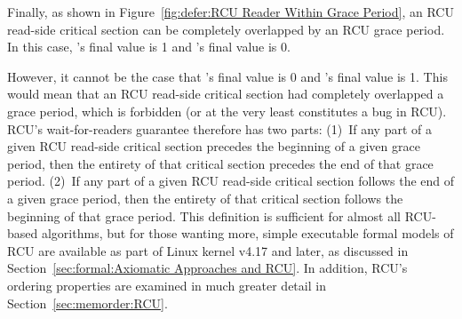 Finally, as shown in
Figure~\ref{fig:defer:RCU Reader Within Grace Period},
an RCU read-side critical section can be completely overlapped by
an RCU grace period.
In this case, 's final value is 1 and 's final value is 0.

However, it cannot be the case that 's final value is 0 and 's
final value is 1.
This would mean that an RCU read-side critical section had completely
overlapped a grace period, which is forbidden (or at the very least
constitutes a bug in RCU).
RCU's wait-for-readers guarantee therefore has two parts:
(1)~If any part of a given RCU read-side critical section precedes
the beginning of a given grace period, then the entirety of that
critical section precedes the end of that grace period.
(2)~If any part of a given RCU read-side critical section follows
the end of a given grace period, then the entirety of that
critical section follows the beginning of that grace period.
This definition is sufficient for almost all RCU-based algorithms, but
for those wanting more,
simple executable formal models of RCU are available
as part of Linux kernel v4.17 and later, as discussed in
Section~\ref{sec:formal:Axiomatic Approaches and RCU}.
In addition, RCU's ordering properties are examined in much
greater detail in Section~\ref{sec:memorder:RCU}.

\QuickQuizEnd

